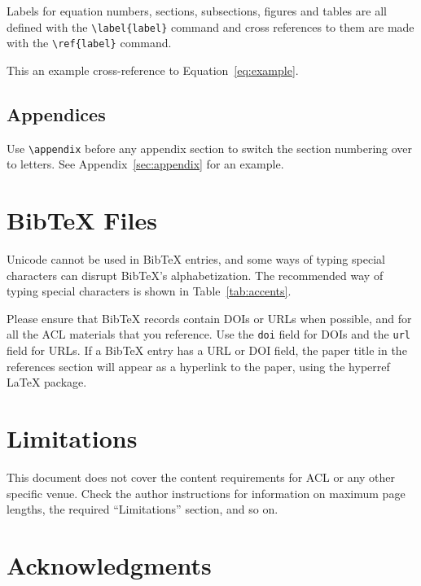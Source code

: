 \documentclass[11pt]{article}
\begin{document}
Labels for equation numbers, sections, subsections, figures and tables
are all defined with the \verb|\label{label}| command and cross references
to them are made with the \verb|\ref{label}| command.

This an example cross-reference to Equation~\ref{eq:example}.

\subsection{Appendices}

Use \verb|\appendix| before any appendix section to switch the section numbering over to letters. See Appendix~\ref{sec:appendix} for an example.

\section{Bib\TeX{} Files}
\label{sec:bibtex}

Unicode cannot be used in Bib\TeX{} entries, and some ways of typing special characters can disrupt Bib\TeX's alphabetization. The recommended way of typing special characters is shown in Table~\ref{tab:accents}.

Please ensure that Bib\TeX{} records contain DOIs or URLs when possible, and for all the ACL materials that you reference.
Use the \verb|doi| field for DOIs and the \verb|url| field for URLs.
If a Bib\TeX{} entry has a URL or DOI field, the paper title in the references section will appear as a hyperlink to the paper, using the hyperref \LaTeX{} package.

\section*{Limitations}

This document does not cover the content requirements for ACL or any
other specific venue.  Check the author instructions for
information on
maximum page lengths, the required ``Limitations'' section,
and so on.

\section*{Acknowledgments}
\end{document}
